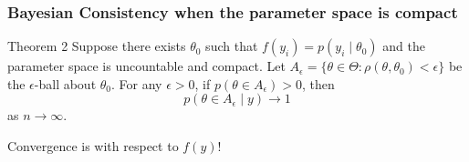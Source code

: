 \documentclass{beamer}
\begin{document}
\begin{frame}
\frametitle{Bayesian Consistency when the parameter space is compact}

\begin{block}{Theorem 2}
Suppose there exists $\theta_0$ such that $f(y_i) = p(y_i \mid \theta_0)$ and the parameter space is uncountable and compact. Let $A_{\epsilon} = \{ \theta \in \Theta : \rho(\theta, \theta_0 ) < \epsilon \}$ be the $\epsilon$-ball about $\theta_0$. For any $\epsilon > 0$, if $p(\theta \in A_{\epsilon}) > 0$, then
$$
p(\theta \in A_{\epsilon} \mid y) \to 1 
$$
as $n \to \infty$.
\end{block}
Convergence is with respect to $f(y)$!


\end{frame}
\end{document}
